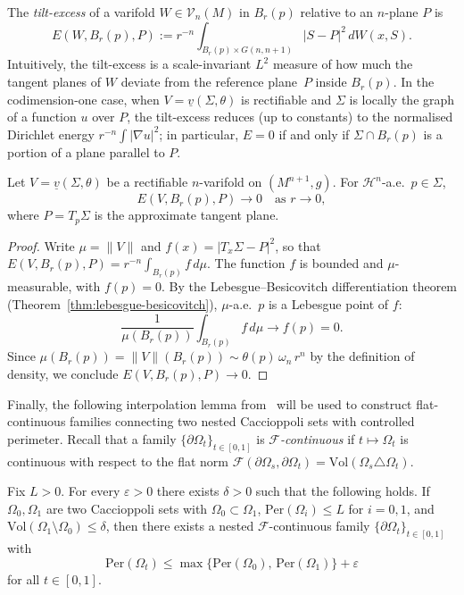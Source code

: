 \begin{definition}\label{def:p2-tilt-excess}
The \emph{tilt-excess} of a varifold $W \in \mathcal{V}_n(M)$ in $B_r(p)$ relative to an $n$-plane $P$ is
\[
E(W, B_r(p), P) := r^{-n} \int_{B_r(p) \times G(n,n+1)} |S - P|^2 \, dW(x, S).
\]
Intuitively, the tilt-excess is a scale-invariant $L^2$ measure of how much the tangent planes of $W$ deviate from the reference plane~$P$ inside $B_r(p)$. In the codimension-one case, when $V = \underline{v}(\Sigma, \theta)$ is rectifiable and $\Sigma$ is locally the graph of a function $u$ over $P$, the tilt-excess reduces (up to constants) to the normalised Dirichlet energy $r^{-n} \int |\nabla u|^2$; in particular, $E = 0$ if and only if $\Sigma \cap B_r(p)$ is a portion of a plane parallel to $P$.

\end{definition}

\begin{lemma}\label{lem:excess-vanishing}
Let $V = \underline{v}(\Sigma, \theta)$ be a rectifiable $n$-varifold on $(M^{n+1}, g)$. For $\mathcal{H}^n$-a.e.\ $p \in \Sigma$,
\[
    E(V, B_r(p), P) \to 0 \quad \text{as } r \to 0,
\]
where $P = T_p\Sigma$ is the approximate tangent plane.
\end{lemma}

\begin{proof}
Write $\mu = \|V\|$ and $f(x) = |T_x\Sigma - P|^2$, so that $E(V, B_r(p), P) = r^{-n}\int_{B_r(p)} f\,d\mu$. The function $f$ is bounded and $\mu$-measurable, with $f(p) = 0$. By the Lebesgue--Besicovitch differentiation theorem (Theorem~\ref{thm:lebesgue-besicovitch}), $\mu$-a.e.\ $p$ is a Lebesgue point of $f$:
\[
    \frac{1}{\mu(B_r(p))}\int_{B_r(p)} f\,d\mu \to f(p) = 0.
\]
Since $\mu(B_r(p)) = \|V\|(B_r(p)) \sim \theta(p)\,\omega_n\, r^n$ by the definition of density, we conclude $E(V, B_r(p), P) \to 0$.
\end{proof}

Finally, the following interpolation lemma from~\cite{CLS22} will be used to construct flat-continuous families connecting two nested Caccioppoli sets with controlled perimeter. Recall that a family $\{\partial\Omega_t\}_{t \in [0,1]}$ is \emph{$\mathcal{F}$-continuous} if $t \mapsto \Omega_t$ is continuous with respect to the flat norm $\mathcal{F}(\partial\Omega_s, \partial\Omega_t) = \mathrm{Vol}(\Omega_s \triangle \Omega_t)$.

\begin{lemma}\label{lem:interpolation}
Fix $L > 0$. For every $\varepsilon > 0$ there exists $\delta > 0$ such that the following holds. If $\Omega_0, \Omega_1$ are two Caccioppoli sets with $\Omega_0 \subset \Omega_1$, $\mathrm{Per}(\Omega_i) \leq L$ for $i = 0, 1$, and $\mathrm{Vol}(\Omega_1 \setminus \Omega_0) \leq \delta$, then there exists a nested $\mathcal{F}$-continuous family $\{\partial\Omega_t\}_{t \in [0,1]}$ with
\[
    \mathrm{Per}(\Omega_t) \leq \max\bigl\{\mathrm{Per}(\Omega_0),\, \mathrm{Per}(\Omega_1)\bigr\} + \varepsilon
\]
for all $t \in [0,1]$.
\end{lemma}

